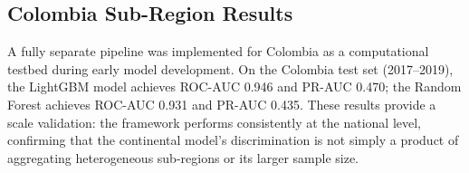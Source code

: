 \documentclass[12pt]{article}
\theoremstyle{break}
\begin{document}
\begin{appendices}
\section{Colombia Sub-Region Results}
\label{app:colombia}

A fully separate pipeline was implemented for Colombia as a computational testbed
during early model development. On the Colombia test set (2017--2019), the LightGBM
model achieves ROC-AUC 0.946 and PR-AUC 0.470; the Random Forest achieves ROC-AUC
0.931 and PR-AUC 0.435. These results provide a scale validation: the framework
performs consistently at the national level, confirming that the continental model's
discrimination is not simply a product of aggregating heterogeneous sub-regions or
its larger sample size.

\end{appendices}
\end{document}
